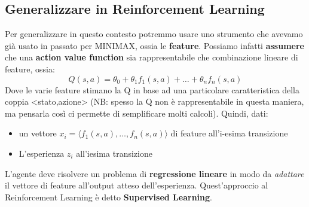 \subsection{Generalizzare in Reinforcement Learning}
Per generalizzare in questo contesto potremmo usare uno strumento che avevamo già usato in passato per MINIMAX, ossia le \textbf{feature}.
Possiamo infatti \textbf{assumere} che una \textbf{action value function} sia rappresentabile che combinazione lineare di feature, ossia:
\begin{equation}
    Q(s,a) = \theta_0 + \theta_1f_1(s,a) + \dots + \theta_nf_n(s,a)
\end{equation}
Dove le varie feature stimano la Q in base ad una particolare caratteristica della coppia <stato,azione> (NB: spesso la Q non è rappresentabile in questa maniera, 
ma pensarla così ci permette di semplificare molti calcoli). Quindi, dati:
\begin{itemize}
    \item un vettore $x_i = \langle f_1(s,a), \dots, f_n(s,a)\rangle $ di feature all'i-esima transizione
    \item L'esperienza $z_i$ all'iesima transizione
\end{itemize} 
L'agente deve risolvere un problema di \textbf{regressione lineare} in modo da \textit{adattare} il vettore di feature all'output atteso dell'esperienza.
Quest'approccio al Reinforcement Learning è detto \textbf{Supervised Learning}.